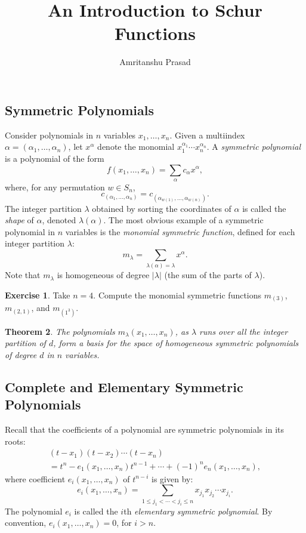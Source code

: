 \documentclass[11pt]{amsart}
\title{An Introduction to Schur Functions}
\author{Amritanshu Prasad}
\newtheorem{theorem}{Theorem}[subsection]
\theoremstyle{definition}
\theoremstyle{example}
\newtheorem{exercise}[theorem]{Exercise}
\begin{document}
\maketitle
\subsection{Symmetric Polynomials}
\label{sec:symmetric-functions}
Consider polynomials in $n$ variables \linebreak $x_1,\dotsc,x_n$.
Given a multiindex $\alpha=(\alpha_1,\dotsc, \alpha_n)$, let $x^\alpha$ denote the monomial $x_1^{\alpha_1}\dotsb x_n^{\alpha_n}$.
A \emph{symmetric polynomial} is a polynomial of the form
\begin{displaymath}
  f(x_1,\dotsc, x_n) = \sum_{\alpha} c_\alpha x^\alpha,
\end{displaymath}
where, for any permutation $w\in S_n$,
\begin{displaymath}
  c_{(\alpha_1,\dotsc,\alpha_n)} = c_{(\alpha_{w(1)},\dotsc,\alpha_{w(n)})}.
\end{displaymath}
The integer partition $\lambda$ obtained by sorting the coordinates of $\alpha$  is called the \emph{shape} of $\alpha$, denoted $\lambda(\alpha)$.
The most obvious example of a symmetric polynomial in $n$ variables is the \emph{monomial symmetric function}, defined for each integer partition $\lambda$:
\begin{displaymath}
  m_\lambda = \sum_{\lambda(\alpha) = \lambda} x^\alpha.
\end{displaymath}
Note that $m_\lambda$ is homogeneous of degree $|\lambda|$ (the sum of the parts of $\lambda$).
\begin{exercise}
  Take $n=4$. Compute the monomial symmetric functions $m_{(3)}$, $m_{(2,1)}$, and $m_{(1^3)}$.
\end{exercise}
\begin{theorem}
The polynomials $m_\lambda(x_1,\dotsc,x_n)$, as $\lambda$ runs over all the integer partition of $d$, form a basis for the space of homogeneous symmetric polynomials of degree $d$ in $n$ variables.
\end{theorem}
\subsection{Complete and Elementary Symmetric Polynomials}
\label{sec:compl-elem-symm}
Recall that the coefficients of a polynomial are symmetric polynomials in its roots:
\begin{multline}
  \label{eq:elem-id}
  (t-x_1)(t-x_2)\dotsb (t-x_n) \\= t^n - e_1(x_1,\dotsc, x_n)t^{n-1} + \dotsb + (-1)^n e_n(x_1,\dotsc, x_n),
\end{multline}
where coefficient $e_i(x_1,\dotsc, x_n)$ of $t^{n-i}$ is given by:
\begin{equation}
  \label{eq:elem}
  e_i(x_1,\dotsc, x_n) = \sum_{1\leq j_1<\dotsb<j_i\leq n} x_{j_1}x_{j_2}\dotsb x_{j_i}.
\end{equation}
The polynomial $e_i$ is called the $i$th \emph{elementary symmetric polynomial}.
By convention, $e_i(x_1,\dotsc,x_n)=0$, for $i>n$.
\end{document}
